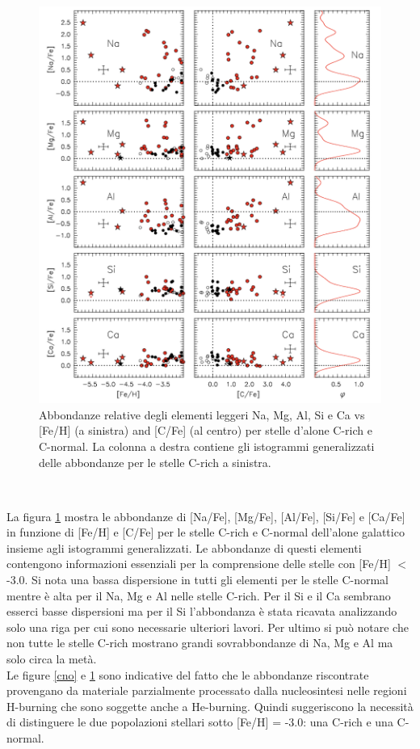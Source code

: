 \documentclass[12pt]{article}
\begin{document}
\begin{figure}[htp!]
\center
  \includegraphics[width=1 \textwidth]{namg}
  \caption{Abbondanze relative degli elementi leggeri Na, Mg, Al, Si e Ca vs [Fe/H] (a sinistra) and [C/Fe] (al centro) per stelle d’alone C-rich e C-normal. La colonna a destra contiene gli istogrammi generalizzati delle abbondanze per le stelle C-rich a sinistra.  
 }
  \label{namg}
 \end{figure}
\

La figura \ref{namg} mostra le abbondanze di [Na/Fe], [Mg/Fe], [Al/Fe], [Si/Fe] e [Ca/Fe] in funzione di [Fe/H] e [C/Fe] per le stelle C-rich e C-normal dell’alone galattico insieme agli istogrammi generalizzati. Le abbondanze di questi elementi contengono informazioni essenziali per la comprensione delle stelle con [Fe/H] $<$ -3.0. Si nota una bassa dispersione in tutti gli elementi per le stelle C-normal mentre è alta per il Na, Mg e Al nelle stelle C-rich. Per il Si e il Ca sembrano esserci basse dispersioni ma per il Si l’abbondanza è stata ricavata analizzando solo una riga per cui sono necessarie ulteriori lavori. Per ultimo si può notare che non tutte le stelle C-rich mostrano grandi sovrabbondanze di Na, Mg e Al ma solo circa la metà. \\
Le figure \ref{cno} e \ref{namg} sono indicative del fatto che le abbondanze riscontrate provengano da materiale parzialmente processato dalla nucleosintesi nelle regioni H-burning che sono soggette anche a He-burning. Quindi suggeriscono la necessità di distinguere le due popolazioni stellari sotto [Fe/H] = -3.0: una C-rich e una C-normal. 
\end{document}
